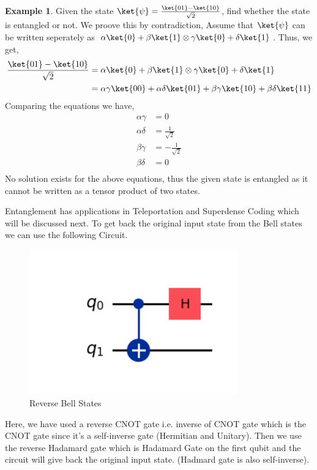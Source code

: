 \documentclass[12pt, oneside]{book}
\theoremstyle{definition}
\theoremstyle{definition}
\newtheorem{example}{Example}[section]
\theoremstyle{remark}
\begin{document}
\begin{example}
    Given the state $\ket{\psi}=\frac{\ket{01}-\ket{10}}{\sqrt{2}}$, find whether the state is entangled or not.
    We proove this by contradiction, Assume that $\ket{\psi}$ can be written seperately as $\alpha\ket{0}+\beta\ket{1} \otimes \gamma\ket{0}+\delta\ket{1}$.
    Thus, we get, 
    \begin{align*}
        \frac{\ket{01}-\ket{10}}{\sqrt{2}}&=\alpha\ket{0}+\beta\ket{1} \otimes \gamma\ket{0}+\delta\ket{1}\\
        &=\alpha\gamma\ket{00}+\alpha\delta\ket{01}+\beta\gamma\ket{10}+\beta\delta\ket{11}\\
    \end{align*}
    Comparing the equations we have, 
    \begin{align*}
        \alpha\gamma&=0 \\
        \alpha\delta&=\frac{1}{\sqrt{2}} \\
        \beta\gamma&=-\frac{1}{\sqrt{2}} \\
        \beta\delta&=0 \\
    \end{align*}
    No solution exists for the above equations, thus the given state is entangled as it cannot be written as a tensor product of two states.
\end{example}
Entanglement has applications in Teleportation and Superdense Coding which will be discussed next.
To get back the original input state from the Bell states we can use the following Circuit.
\begin{figure}[H]
    \centering
    \includegraphics[width=0.8\textwidth]{../images/bell-states-rev.png}
    \caption{Reverse Bell States}
    \label{fig:bell-states-rev}
\end{figure}
Here, we have used a reverse CNOT gate i.e. inverse of CNOT gate which is the CNOT gate since it's a self-inverse gate (Hermitian and Unitary).
Then we use the reverse Hadamard gate which is Hadamard Gate on the first qubit and the circuit will give back the original input state. (Hadmard gate is also self-inverse).
\end{document}
